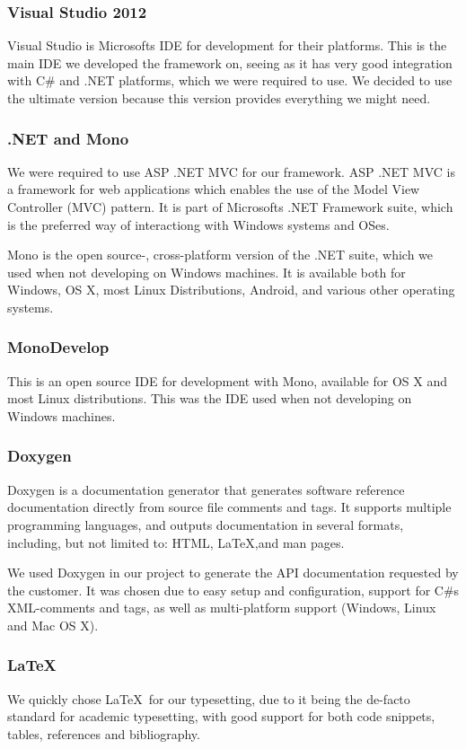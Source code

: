 \subsubsection{Visual Studio 2012}
Visual Studio is Microsofts IDE for development for their platforms. This is the main IDE we developed the framework on, seeing as it has very good integration with C\# and .NET platforms, which we were required to use. We decided to use the ultimate version because this version provides everything we might need.

\subsubsection{.NET and Mono}
We were required to use ASP .NET MVC for our framework. ASP .NET MVC is a framework for web applications which enables the use of the Model View Controller (MVC) pattern. It is part of Microsofts .NET Framework suite, which is the preferred way of interactiong with Windows systems and OSes.

Mono is the open source-, cross-platform version of the .NET suite, which we used when not developing on Windows machines. It is available both for Windows, OS X, most Linux Distributions, Android, and various other operating systems.

\subsubsection{MonoDevelop}
This is an open source IDE for development with Mono, available for OS X and most Linux distributions. This was the IDE used when not developing on Windows machines.

\subsubsection{Doxygen}
Doxygen is a documentation generator that generates software reference documentation directly from source file comments and tags. It supports multiple programming languages, and outputs documentation in several formats, including, but not limited to: HTML, {LaTeX},and man pages.

We used Doxygen in our project to generate the API documentation requested by the customer. It was chosen due to easy setup and configuration, support for C\#s XML-comments and tags, as well as multi-platform support (Windows, Linux and Mac OS X).

\subsubsection{\LaTeX}
We quickly chose \LaTeX \ for our typesetting, due to it being the de-facto standard for academic typesetting, with good support for both code snippets, tables, references and bibliography.

